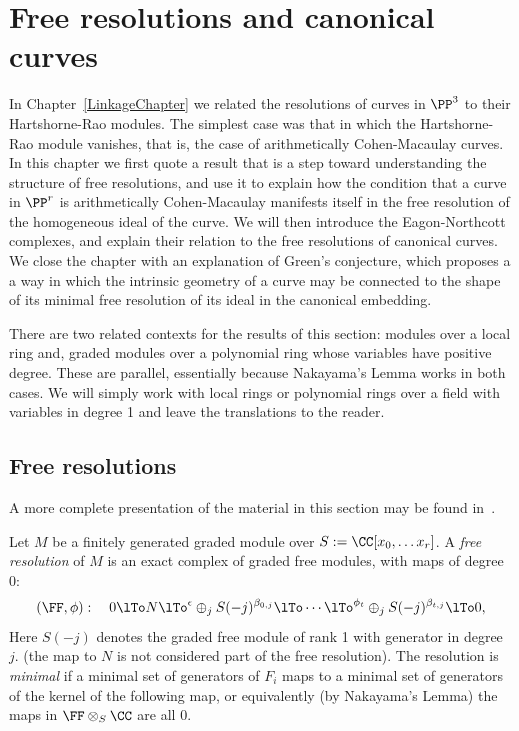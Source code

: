 

\chapter{Free resolutions and canonical curves}
\label{SyzygiesChapter}

\def\length{{\rm length}}

In Chapter~\ref{LinkageChapter} we related the resolutions of curves in $\PP^3$ to their Hartshorne-Rao modules. The
simplest case was that in which the Hartshorne-Rao module vanishes, that is, the case of arithmetically Cohen-Macaulay curves.
In this chapter we first quote a result that is a step toward understanding the structure of free resolutions, and use it to explain how the condition that a curve in $\PP^r$ is arithmetically Cohen-Macaulay manifests itself in the 
free resolution of the homogeneous ideal of the curve.  We will then introduce the Eagon-Northcott complexes, and explain their relation to the free resolutions of canonical curves. We close the chapter with an explanation of Green's conjecture, which proposes a a way in which the intrinsic geometry
of a curve may be connected to the shape of its minimal free resolution of its ideal in the canonical embedding.

\begin{remark}
 There are two related contexts for the results of this section:  modules over a local ring and, graded modules over a polynomial ring whose variables have positive degree. These are parallel, essentially because Nakayama's Lemma works in both cases. We will simply work with local rings or polynomial rings over a field with variables in degree 1 and leave the translations to the reader.\end{remark}

\section{Free resolutions}
A more complete presentation of the material in this section may be found in~\cite[Chapter ****]{Eisenbud1995}.


Let $M$ be a finitely generated graded module over $S := \CC[x_0, \dots x_r]$. A \emph{free resolution} of $M$ is an exact complex
of graded free modules, with maps of degree 0:
$$
(\FF, \phi):\quad 0\lTo N \lTo^\epsilon \oplus_jS(-j)^{\beta_{0,j}} \lTo\cdots
 \lTo^{\phi_t}\oplus_jS(-j)^{\beta_{t,j}}\lTo 0,
$$
Here $S(-j)$ denotes the graded free module of rank 1 with generator in degree $j$.
(the map to $N$ is not considered part of the free resolution). The resolution is \emph{minimal} if a minimal set of generators of $F_i$ maps to a minimal set of generators of the kernel of the following map,
or equivalently (by Nakayama's Lemma) the maps in $\FF\otimes_S \CC$ are all 0.


